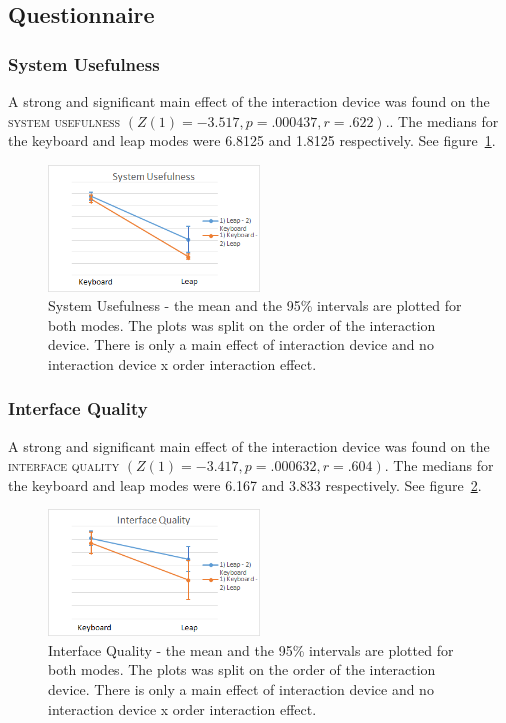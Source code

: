 \subsection{Questionnaire}
\subsubsection{System Usefulness}

A strong and significant main effect of the interaction device was found on the \textsc{system usefulness} $(Z(1) = -3.517, p = .000437, r = .622)$.. The medians for the keyboard and leap modes were 6.8125 and 1.8125 respectively. See figure~\ref{fig:system_usefulness}.

\begin{figure}[H]
\centering
\includegraphics[width=0.5\textwidth]{imgs/results/system_usefulness}
\caption{System Usefulness - the mean and the 95\% intervals are plotted for both modes. The plots was split on the order of the interaction device. There is only a main effect of interaction device and no interaction device x order interaction effect.}
\label{fig:system_usefulness}
\end{figure}

\subsubsection{Interface Quality}

A strong and significant main effect of the interaction device was found on the \textsc{interface quality} $(Z(1) = -3.417, p = .000632, r = .604)$. The medians for the keyboard and leap modes were 6.167 and 3.833 respectively. See figure~\ref{fig:interface_quality}.

\begin{figure}[H]
\centering
\includegraphics[width=0.5\textwidth]{imgs/results/interface_quality}
\caption{Interface Quality - the mean and the 95\% intervals are plotted for both modes. The plots was split on the order of the interaction device. There is only a main effect of interaction device and no interaction device x order interaction effect.}
\label{fig:interface_quality}
\end{figure}

